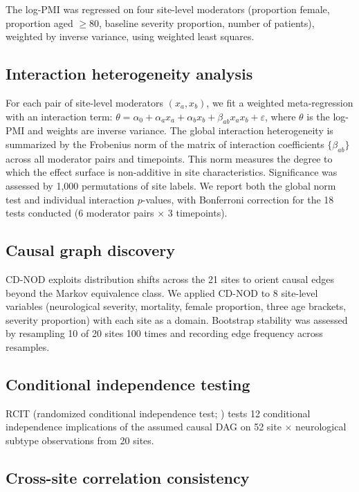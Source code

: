 \documentclass{article}
\begin{document}
The log-PMI was regressed on four site-level moderators (proportion female, proportion aged $\geq 80$, baseline severity proportion, number of patients), weighted by inverse variance, using weighted least squares.

\subsection{Interaction heterogeneity analysis}

For each pair of site-level moderators $(x_a, x_b)$, we fit a weighted meta-regression with an interaction term: $\theta = \alpha_0 + \alpha_a x_a + \alpha_b x_b + \beta_{ab} x_a x_b + \varepsilon$, where $\theta$ is the log-PMI and weights are inverse variance.
The global interaction heterogeneity is summarized by the Frobenius norm of the matrix of interaction coefficients $\{\beta_{ab}\}$ across all moderator pairs and timepoints.
This norm measures the degree to which the effect surface is non-additive in site characteristics.
Significance was assessed by 1,000 permutations of site labels.
We report both the global norm test and individual interaction $p$-values, with Bonferroni correction for the 18 tests conducted (6 moderator pairs $\times$ 3 timepoints).

\subsection{Causal graph discovery}

CD-NOD \cite{huang2020cdnod} exploits distribution shifts across the 21 sites to orient causal edges beyond the Markov equivalence class.
We applied CD-NOD to 8 site-level variables (neurological severity, mortality, female proportion, three age brackets, severity proportion) with each site as a domain.
Bootstrap stability was assessed by resampling 10 of 20 sites 100 times and recording edge frequency across resamples.

\subsection{Conditional independence testing}

RCIT (randomized conditional independence test; \citealt{strobl2019rcit}) tests 12 conditional independence implications of the assumed causal DAG on 52 site $\times$ neurological subtype observations from 20 sites.

\subsection{Cross-site correlation consistency}
\end{document}
